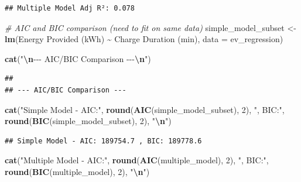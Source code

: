 \documentclass[
  12pt,
]{article}
\newenvironment{Shaded}{\begin{snugshade}}{\end{snugshade}}
\newcommand{\AttributeTok}[1]{\textcolor[rgb]{0.13,0.29,0.53}{#1}}
\newcommand{\CommentTok}[1]{\textcolor[rgb]{0.56,0.35,0.01}{\textit{#1}}}
\newcommand{\DecValTok}[1]{\textcolor[rgb]{0.00,0.00,0.81}{#1}}
\newcommand{\FunctionTok}[1]{\textcolor[rgb]{0.13,0.29,0.53}{\textbf{#1}}}
\newcommand{\NormalTok}[1]{#1}
\newcommand{\OtherTok}[1]{\textcolor[rgb]{0.56,0.35,0.01}{#1}}
\newcommand{\SpecialCharTok}[1]{\textcolor[rgb]{0.81,0.36,0.00}{\textbf{#1}}}
\newcommand{\StringTok}[1]{\textcolor[rgb]{0.31,0.60,0.02}{#1}}
\begin{document}
\begin{verbatim}
## Multiple Model Adj R²: 0.078
\end{verbatim}

\begin{Shaded}
\begin{Highlighting}[]
\CommentTok{\# AIC and BIC comparison (need to fit on same data)}
\NormalTok{simple\_model\_subset }\OtherTok{\textless{}{-}} \FunctionTok{lm}\NormalTok{(}\StringTok{\textasciigrave{}}\AttributeTok{Energy Provided (kWh)}\StringTok{\textasciigrave{}} \SpecialCharTok{\textasciitilde{}} \StringTok{\textasciigrave{}}\AttributeTok{Charge Duration (min)}\StringTok{\textasciigrave{}}\NormalTok{,}
    \AttributeTok{data =}\NormalTok{ ev\_regression)}

\FunctionTok{cat}\NormalTok{(}\StringTok{"}\SpecialCharTok{\textbackslash{}n}\StringTok{{-}{-}{-} AIC/BIC Comparison {-}{-}{-}}\SpecialCharTok{\textbackslash{}n}\StringTok{"}\NormalTok{)}
\end{Highlighting}
\end{Shaded}

\begin{verbatim}
## 
## --- AIC/BIC Comparison ---
\end{verbatim}

\begin{Shaded}
\begin{Highlighting}[]
\FunctionTok{cat}\NormalTok{(}\StringTok{"Simple Model {-} AIC:"}\NormalTok{, }\FunctionTok{round}\NormalTok{(}\FunctionTok{AIC}\NormalTok{(simple\_model\_subset), }\DecValTok{2}\NormalTok{),}
    \StringTok{", BIC:"}\NormalTok{, }\FunctionTok{round}\NormalTok{(}\FunctionTok{BIC}\NormalTok{(simple\_model\_subset), }\DecValTok{2}\NormalTok{), }\StringTok{"}\SpecialCharTok{\textbackslash{}n}\StringTok{"}\NormalTok{)}
\end{Highlighting}
\end{Shaded}

\begin{verbatim}
## Simple Model - AIC: 189754.7 , BIC: 189778.6
\end{verbatim}

\begin{Shaded}
\begin{Highlighting}[]
\FunctionTok{cat}\NormalTok{(}\StringTok{"Multiple Model {-} AIC:"}\NormalTok{, }\FunctionTok{round}\NormalTok{(}\FunctionTok{AIC}\NormalTok{(multiple\_model), }\DecValTok{2}\NormalTok{), }\StringTok{", BIC:"}\NormalTok{,}
    \FunctionTok{round}\NormalTok{(}\FunctionTok{BIC}\NormalTok{(multiple\_model), }\DecValTok{2}\NormalTok{), }\StringTok{"}\SpecialCharTok{\textbackslash{}n}\StringTok{"}\NormalTok{)}
\end{Highlighting}
\end{Shaded}
\end{document}

